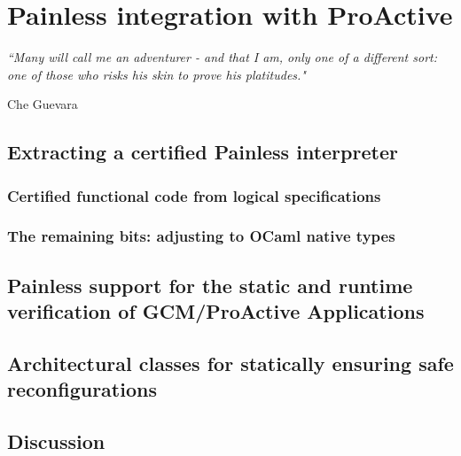 
\chapter{\textsf{Painless} integration with ProActive} 
\label{chap:extraction} 


\epigraph{\textit{“Many will call me an adventurer - and that I am, only one of a different sort: 
                             one of those who risks his skin to prove his platitudes."}}{Che Guevara}



\minitoc



\section{Extracting a certified \textsf{Painless} interpreter}
\label{sec:extraction}

\subsection{Certified functional code from logical specifications}
\label{sub:execcode}

\subsection{The remaining bits: adjusting to OCaml native types}
\label{sub:ocamltypes}



\section{\textsf{Painless} support for the static and runtime verification of GCM/ProActive Applications}
\label{sec:prointegration}



\section{Architectural classes for statically ensuring safe reconfigurations} %
\label{sec:noruntime}


\section{Discussion}
\label{sec:discussion}


